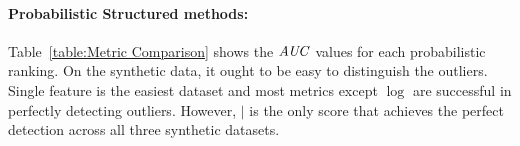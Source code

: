 %																
%															
%																		
\paragraph{Probabilistic Structured methods:}
Table~\ref{table:Metric Comparison} shows the $\it{AUC}$ values for each probabilistic ranking. On the synthetic data, it ought to be easy to distinguish the outliers. Single feature is the easiest dataset and most metrics except $\log$ are successful in perfectly detecting outliers.  However, $\mid$ is the only score that achieves the perfect detection across all three synthetic datasets. 
